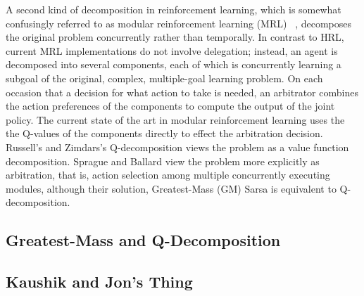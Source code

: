 A second kind of decomposition in reinforcement learning, which is somewhat confusingly referred to as modular reinforcement learning (MRL) ~\cite{russell2003q-decomposition,sprague2003multiple-goal}, decomposes the original problem concurrently rather than temporally. In contrast to HRL, current MRL implementations do not involve delegation; instead, an agent is decomposed into several components, each of which is concurrently learning a subgoal of the original, complex, multiple-goal learning problem. On each occasion that a decision for what action to take is needed, an arbitrator combines the action preferences of the components to compute the output of the joint policy.  The current state of the art in modular reinforcement learning uses the the Q-values of the components directly to effect the arbitration decision.  Russell's and Zimdars's Q-decomposition \cite{russell2003q-decomposition} views the problem as a value function decomposition.  Sprague and Ballard view the problem more explicitly as arbitration, that is, action selection among multiple concurrently executing modules, although their solution, Greatest-Mass (GM) Sarsa \cite{sprague2003multiple-goal} is equivalent to Q-decomposition.


\subsection{Greatest-Mass and Q-Decomposition}

\subsection{Kaushik and Jon's Thing}
